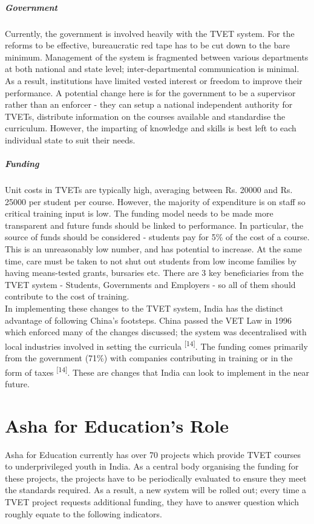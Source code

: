 \documentclass[a4paper, 10pt]{article}
\begin{document}
\subparagraph*{Government}
Currently, the government is involved heavily with the TVET system. For the reforms to be effective, bureaucratic red tape has to be cut down to the bare minimum. Management of the system is fragmented between various departments at both national and state level; inter-departmental communication is minimal. As a result, institutions have limited vested interest or freedom to improve their performance. A potential change here is for the government to be a supervisor rather than an enforcer - they can setup a national independent authority for TVETs, distribute information on the courses available and standardise the curriculum. However, the imparting of knowledge and skills is best left to each individual state to suit their needs.

\subparagraph*{Funding}
Unit costs in TVETs are typically high, averaging between Rs. 20000 and Rs. 25000 per student per course. However, the majority of expenditure is on staff so critical training input is low. The funding model needs to be made more transparent and future funds should be linked to performance. In particular, the source of funds should be considered - students pay for 5\% of the cost of a course. This is an unreasonably low number, and has potential to increase. At the same time, care must be taken to not shut out students from low income families by having means-tested grants, bursaries etc. There are 3 key beneficiaries from the TVET system - Students, Governments and Employers - so all of them should contribute to the cost of training. \\

\noindent In implementing these changes to the TVET system, India has the distinct advantage of following China's footsteps. China passed the VET Law in 1996 which 	enforced many of the changes discussed; the system was decentralised with local industries involved in setting the curricula \textsuperscript{[14]}. The funding comes primarily from the government (71\%) with companies contributing in training or in the form of taxes \textsuperscript{[14]}. These are changes that India can look to implement in the near future.  

\section*{Asha for Education's Role}
Asha for Education currently has over 70 projects which provide TVET courses to underprivileged youth in India. As a central body organising the funding for these projects, the projects have to be periodically evaluated to ensure they meet the standards required. As a result, a new system will be rolled out; every time a TVET project requests additional funding, they have to answer question which roughly equate to the following indicators.
\end{document}
